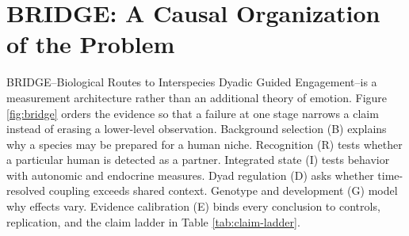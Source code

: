 \documentclass[conference]{IEEEtran}
\begin{document}
\section{BRIDGE: A Causal Organization of the Problem}

BRIDGE--Biological Routes to Interspecies Dyadic Guided Engagement--is a measurement architecture rather than an additional theory of emotion. Figure \ref{fig:bridge} orders the evidence so that a failure at one stage narrows a claim instead of erasing a lower-level observation. Background selection (B) explains why a species may be prepared for a human niche. Recognition (R) tests whether a particular human is detected as a partner. Integrated state (I) tests behavior with autonomic and endocrine measures. Dyad regulation (D) asks whether time-resolved coupling exceeds shared context. Genotype and development (G) model why effects vary. Evidence calibration (E) binds every conclusion to controls, replication, and the claim ladder in Table \ref{tab:claim-ladder}.
\end{document}
